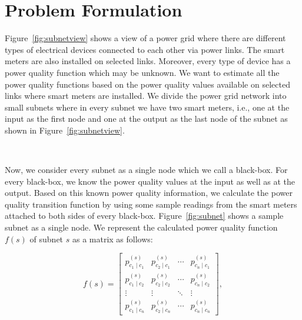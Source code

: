 \section{Problem Formulation}
Figure~\ref{fig:subnetview} shows a view of a power grid where there are different types of electrical devices connected to each other via power links. The smart meters are also installed on selected links. Moreover, every type of device has a power quality function which may be unknown. We want to estimate all the power quality functions based on the power quality values available on selected links where smart meters are installed. We divide the power grid network into small subnets where in every subnet we have two smart meters, i.e., one at the input as the first node and one at the output as the last node of the subnet as shown in Figure~\ref{fig:subnetview}.

\begin{figure*}[!t]
\centering \scriptsize
	\qquad
	\\
\caption{Subnet power transition matrix as a product of power transition matrices of individual devices.} \label{fig:subnet}
\end{figure*}

Now, we consider every subnet as a single node which we call a black-box. For every black-box, we know the power quality values at the input as well as at the output. Based on this known power quality information, we calculate the power quality transition function by using some sample readings from the smart meters attached to both sides of every black-box. Figure~\ref{fig:subnet} shows a sample subnet as a single node. We represent the calculated power quality function $f(s)$  of subnet $s$ as a matrix as follows:

\begin{equation}
f(s) = \left[\begin{array}{cccc} p_{c_1 \mid c_1}^{(s)} & p_{c_2 \mid c_1}^{(s)} & \cdots & p_{c_n \mid c_1}^{(s)}\\
p_{c_1 \mid c_2}^{(s)} & p_{c_2 \mid c_2}^{(s)} & \cdots & p_{c_n \mid c_2}^{(s)}\\
\vdots & \vdots& \ddots & \vdots\\
p_{c_1 \mid c_n}^{(s)} & p_{c_2 \mid c_n}^{(s)} & \cdots & p_{c_n \mid c_n}^{(s)}
\end{array}\right],
\end{equation}

